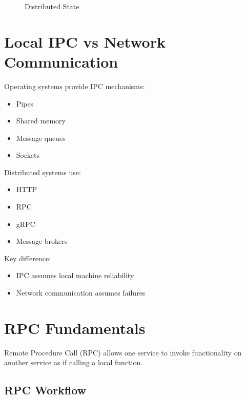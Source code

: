 \begin{figure}[H]
\centering
{}
\caption{Distributed State}
\end{figure}

\section{Local IPC vs Network Communication}

Operating systems provide IPC mechanisms:

\begin{itemize}
\item Pipes
\item Shared memory
\item Message queues
\item Sockets
\end{itemize}

Distributed systems use:

\begin{itemize}
\item HTTP
\item RPC
\item gRPC
\item Message brokers
\end{itemize}

Key difference:

\begin{itemize}
\item IPC assumes local machine reliability
\item Network communication assumes failures
\end{itemize}

\section{RPC Fundamentals}

Remote Procedure Call (RPC) allows one service to invoke functionality on another service as if calling a local function.

\subsection{RPC Workflow}

